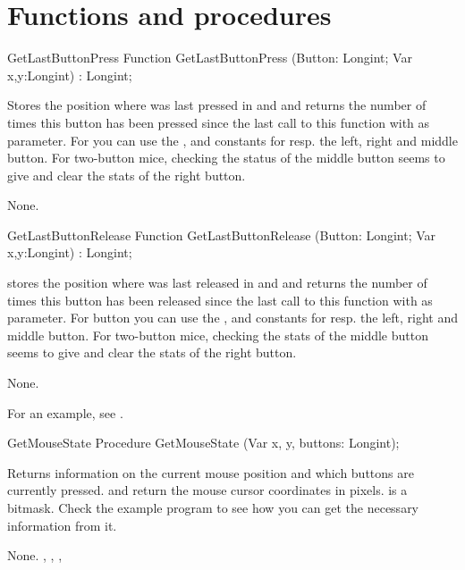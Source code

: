 \section{Functions and procedures}
\begin{function}{GetLastButtonPress}
\Declaration
Function GetLastButtonPress (Button: Longint; Var x,y:Longint) : Longint;

\Description
 
Stores the position where  was last pressed in  and
 and returns
the number of times this button has been pressed since the last call to this
function with  as parameter. For  you can use the 
,  and  constants for resp. the left, 
right and middle button.
For two-button mice, checking the status of the middle button seems to give
and clear the stats of the right button.

\Errors
None.
\SeeAlso
{}
\end{function}
\html{}
\begin{function}{GetLastButtonRelease}
\Declaration
Function GetLastButtonRelease (Button: Longint; Var x,y:Longint) : Longint;

\Description

stores the position where  was last released in  and 
 and returns
the number of times this button has been released since the last call to this
function with  as parameter. For button you can use the
,  and  constants for resp. 
the left, right and middle button.
For two-button mice, checking the stats of the middle button seems to give
and clear the stats of the right button.

\Errors
None.
\SeeAlso
{}
\end{function}
For an example, see .
\begin{procedure}{GetMouseState}
\Declaration
Procedure GetMouseState (Var x, y, buttons: Longint);

\Description

 Returns information on the current mouse position 
and which buttons are currently pressed.
 and  return the mouse cursor coordinates in pixels.
 is a bitmask. Check the example program to see how you can get the
necessary information from it.

\Errors
None.
\SeeAlso
{}, , ,
\end{procedure}
